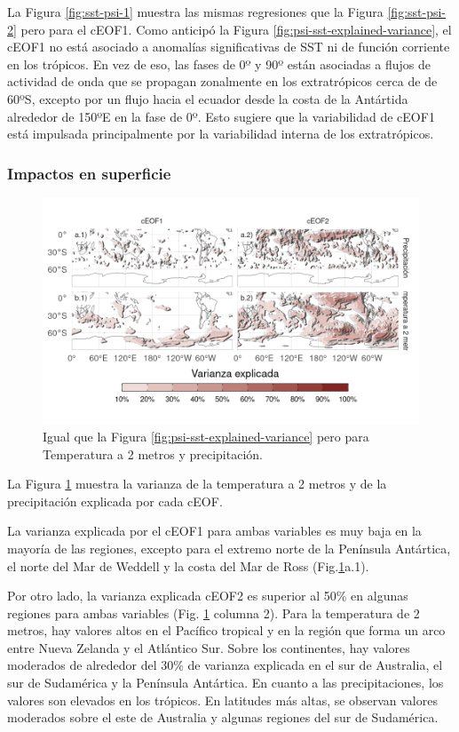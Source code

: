 \documentclass[12pt,oneside]{reedthesis}
\begin{document}
La Figura \ref{fig:sst-psi-1} muestra las mismas regresiones que la Figura \ref{fig:sst-psi-2} pero para el cEOF1.
Como anticipó la Figura \ref{fig:psi-sst-explained-variance}, el cEOF1 no está asociado a anomalías significativas de SST ni de función corriente en los trópicos.
En vez de eso, las fases de 0º y 90º están asociadas a flujos de actividad de onda que se propagan zonalmente en los extratrópicos cerca de de 60ºS, excepto por un flujo hacia el ecuador desde la costa de la Antártida alrededor de 150ºE en la fase de 0º.
Esto sugiere que la variabilidad de cEOF1 está impulsada principalmente por la variabilidad interna de los extratrópicos.

\hypertarget{impactos-en-superficie}{%
\subsubsection{Impactos en superficie}\label{impactos-en-superficie}}

\begin{figure}
\includegraphics{figures/20-ceofs/pp-t2m-r2-1} \caption{Igual que la Figura \ref{fig:psi-sst-explained-variance} pero para Temperatura a 2 metros y precipitación.}\label{fig:pp-t2m-r2}
\end{figure}



La Figura \ref{fig:pp-t2m-r2} muestra la varianza de la temperatura a 2 metros y de la precipitación explicada por cada cEOF.

La varianza explicada por el cEOF1 para ambas variables es muy baja en la mayoría de las regiones, excepto para el extremo norte de la Península Antártica, el norte del Mar de Weddell y la costa del Mar de Ross (Fig.\ref{fig:pp-t2m-r2}a.1).

Por otro lado, la varianza explicada cEOF2 es superior al 50\% en algunas regiones para ambas variables (Fig. \ref{fig:pp-t2m-r2} columna 2).
Para la temperatura de 2 metros, hay valores altos en el Pacífico tropical y en la región que forma un arco entre Nueva Zelanda y el Atlántico Sur.
Sobre los continentes, hay valores moderados de alrededor del 30\% de varianza explicada en el sur de Australia, el sur de Sudamérica y la Península Antártica.
En cuanto a las precipitaciones, los valores son elevados en los trópicos.
En latitudes más altas, se observan valores moderados sobre el este de Australia y algunas regiones del sur de Sudamérica.
\end{document}
